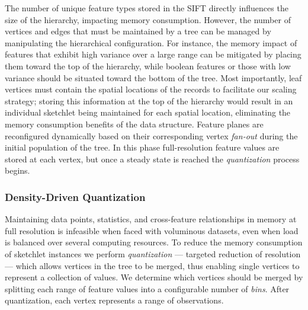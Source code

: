 The number of unique feature types stored in the SIFT directly influences the size of the hierarchy, impacting memory consumption. However, the number of vertices and edges that must be maintained by a tree can be managed by manipulating the hierarchical configuration. For instance, the memory impact of features that exhibit high variance over a large range can be mitigated by placing them toward the top of the hierarchy, while boolean features or those with low variance should be situated toward the bottom of the tree. Most importantly, leaf vertices must contain the spatial locations of the records to facilitate our scaling strategy; storing this information at the top of the hierarchy would result in an individual sketchlet being maintained for each spatial location, eliminating the memory consumption benefits of the data structure. Feature planes are reconfigured dynamically based on their corresponding vertex \emph{fan-out} during the initial population of the tree. In this phase full-resolution feature values are stored at each vertex, but once a steady state is reached the \emph{quantization} process begins.

\subsubsection{Density-Driven Quantization}
Maintaining data points, statistics, and cross-feature relationships in memory at full resolution is infeasible when faced with voluminous datasets, even when load is balanced over several computing resources. To reduce the memory consumption of sketchlet instances we perform \emph{quantization} --- targeted reduction of resolution --- which allows vertices in the tree to be merged, thus enabling single vertices to represent a collection of values. We determine which vertices should be merged by splitting each range of feature values into a configurable number of \emph{bins}. After quantization, each vertex represents a range of observations.

